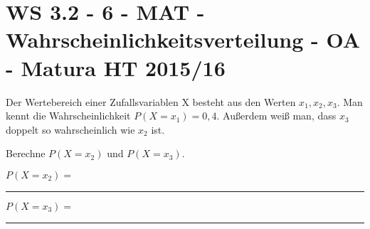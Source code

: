 \section{WS 3.2 - 6 - MAT - Wahrscheinlichkeitsverteilung - OA - Matura HT 2015/16}

\begin{beispiel}[WS 3.2]{1} %
Der Wertebereich einer Zufallsvariablen X besteht aus den Werten $x_1, x_2, x_3$.
Man kennt die Wahrscheinlichkeit $P(X = x_1) = 0,4$. Außerdem weiß man, dass $x_3$ doppelt so wahrscheinlich wie $x_2$ ist. \leer

Berechne $P(X=x_2)$ und $P(X=x_3)$. \leer

$P(X=x_2)=$ \rule{5cm}{0.3pt} \leer

$P(X=x_3)=$ \rule{5cm}{0.3pt} \leer


\end{beispiel}
